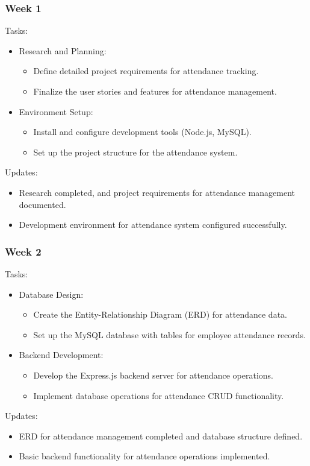 \documentclass[a4paper, 12pt]{article}
\begin{document}
\subsubsection{Week 1}
Tasks:
\begin{itemize}
    \item Research and Planning:
    \begin{itemize}
        \item Define detailed project requirements for attendance tracking.
        \item Finalize the user stories and features for attendance management.
    \end{itemize}
    \item Environment Setup:
    \begin{itemize}
        \item Install and configure development tools (Node.js, MySQL).
        \item Set up the project structure for the attendance system.
    \end{itemize}
\end{itemize}
Updates:
\begin{itemize}
    \item Research completed, and project requirements for attendance management documented.
    \item Development environment for attendance system configured successfully.
\end{itemize}

\subsubsection{Week 2}
Tasks:
\begin{itemize}
    \item Database Design:
    \begin{itemize}
        \item Create the Entity-Relationship Diagram (ERD) for attendance data.
        \item Set up the MySQL database with tables for employee attendance records.
    \end{itemize}
    \item Backend Development:
    \begin{itemize}
        \item Develop the Express.js backend server for attendance operations.
        \item Implement database operations for attendance CRUD functionality.
    \end{itemize}
\end{itemize}
Updates:
\begin{itemize}
    \item ERD for attendance management completed and database structure defined.
    \item Basic backend functionality for attendance operations implemented.
\end{itemize}
\end{document}
